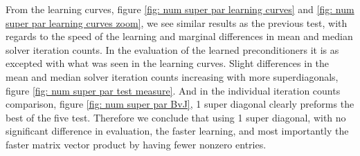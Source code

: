 From the learning curves, figure \ref{fig: num super par learning curves} and \ref{fig: num super par learning curves zoom}, we see similar results as the previous test, with regards to the speed of the learning and marginal differences in mean and median solver iteration counts. In the evaluation of the learned preconditioners it is as excepted with what was seen in the learning curves. Slight differences in the mean and median solver iteration counts increasing with more superdiagonals, figure \ref{fig: num super par test measure}. And in the individual iteration counts comparison, figure \ref{fig: num super par BvJ}, 1 super diagonal clearly preforms the best of the five test. Therefore we conclude that using 1 super diagonal, with no significant difference in evaluation, the faster learning, and most importantly the faster matrix vector product by having fewer nonzero entries.


